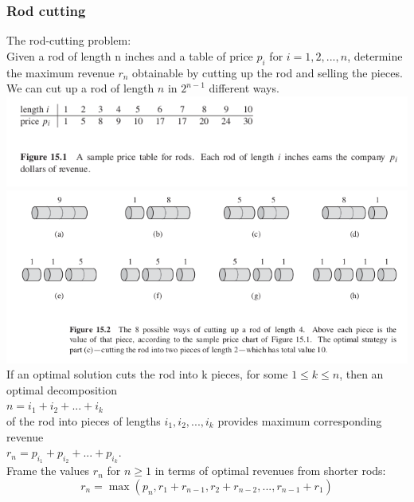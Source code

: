 \documentclass[11pt]{article}
\begin{document}
\subsubsection{Rod cutting}
\label{sec-5-1-1}
The rod-cutting problem: \\
Given a rod of length n inches and a table of price $p_i$ for $i=1,2,...,n$, determine the maximum revenue $r_n$ obtainable by cutting up the rod and selling the pieces. \\

We can cut up a rod of length $n$ in $2^{n-1}$ different ways. \\

\includegraphics[width=.9\linewidth]{pics/c15_rod_cutting1.png} \\

\includegraphics[width=.9\linewidth]{pics/c15_rod_cutting2.png} \\

If an optimal solution cuts the rod into k pieces, for some $1\le k \le n$, then an optimal decomposition \\
$n = i_1 + i_2 + ... + i_k$ \\
of the rod into pieces of lengths $i_1,i_2,...,i_k$ provides maximum corresponding revenue \\
$r_n = p_{i_1} + p_{i_2} + ... + p_{i_k}$. \\

Frame the values $r_n$ for $n\ge 1$ in terms of optimal revenues from shorter rods: \\
\begin{equation}
r_n = \max(p_n, r_1+r_{n-1}, r_2+r_{n-2},...,r_{n-1}+r_1)
\end{equation}
\end{document}
